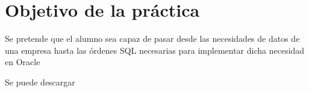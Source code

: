 
\usepackage{eurosym}

\newcommand{\anio}{2019}




\renewcommand{\hmwkTitle}{Diseño E/R, paso a SQL e inserción de datos}
\renewcommand{\hmwkClass}{Gestión de Bases de Datos}

\usepackage{enumitem}%






\primerapagina%


\section{Objetivo de la práctica}
Se pretende que el alumno sea capaz de pasar desde las necesidades de datos de una empresa hasta las órdenes SQL necesarias para implementar dicha necesidad en Oracle

Se puede descargar 

